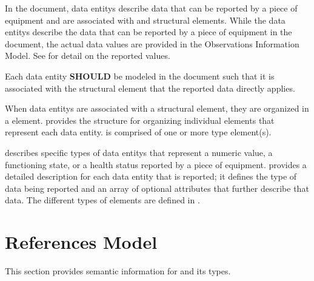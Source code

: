 In the  document, \glspl{data entity} describe data that can be reported by a piece of equipment and are associated with  and  \glspl{structural element}.   While the \glspl{data entity} describe the data that can be reported by a piece of equipment in the  document, the actual data values are provided in the \gls{Observations Information Model}.   See  for detail on the reported values.

Each \gls{data entity} \textbf{SHOULD} be modeled in the  document such that it is associated with the \gls{structural element} that the reported data directly applies.

When \glspl{data entity} are associated with a \gls{structural element}, they are organized in a  element.    provides the structure for organizing individual  elements that represent each \gls{data entity}.  is comprised of one or more  type element(s).

 describes specific types of \glspl{data entity} that represent a numeric value, a functioning state, or a health status reported by a piece of equipment.  provides a detailed description for each \gls{data entity} that is reported; it defines the type of data being reported and an array of optional attributes that further describe that data.   The different types of  elements are defined in .













\section{References Model}
\label{sec:References Model}

This section provides semantic information for  and its types.



